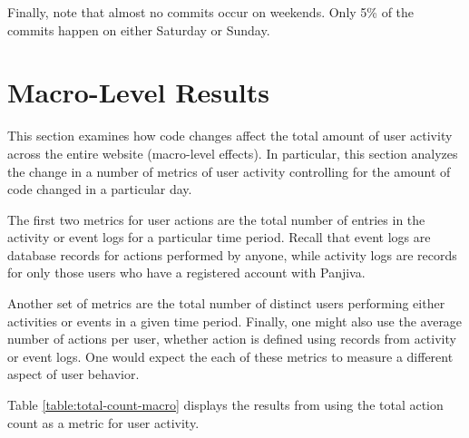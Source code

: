 \documentclass[psamsfonts]{amsart}
\begin{document}
Finally, note that almost no commits occur on weekends. Only 5\% of the commits happen on either Saturday or Sunday.

\section{Macro-Level Results}

This section examines how code changes affect the total amount of user activity across the entire website (macro-level effects). In particular, this section analyzes the change in a number of metrics of user activity controlling for the amount of code changed in a particular day. 

The first two metrics for user actions are the total number of entries in the activity or event logs for a particular time period. Recall that event logs are database records for actions performed by anyone, while activity logs are records for only those users who have a registered account with Panjiva.

Another set of metrics are the total number of distinct users performing either activities or events in a given time period. Finally, one might also use the average number of actions per user, whether action is defined using records from activity or event logs. One would expect the each of these metrics to measure a different aspect of user behavior. 

Table \ref{table:total-count-macro} displays the results from using the total action count as a metric for user activity.
\end{document}
